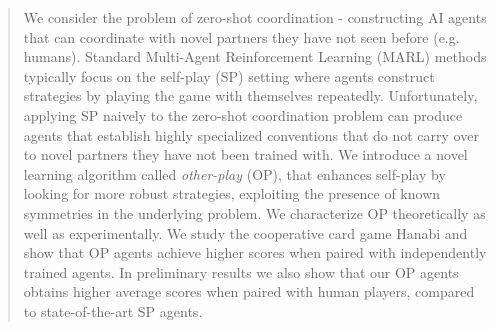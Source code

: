 \begin{abstract}
We consider the problem of zero-shot coordination - constructing AI agents that can coordinate with novel partners they have not seen before (e.g. humans). Standard Multi-Agent Reinforcement Learning (MARL) methods typically focus on the self-play (SP) setting where agents construct strategies by playing the game with themselves repeatedly. Unfortunately, applying SP naively to the zero-shot coordination problem can produce agents that establish highly specialized conventions that do not carry over to novel partners they have not been trained with. We introduce a novel learning algorithm called \emph{other-play} (OP), that enhances self-play by looking for more robust strategies, exploiting the presence of known symmetries in the underlying problem. We characterize OP theoretically as well as experimentally. We study the cooperative card game Hanabi and show that OP agents achieve higher scores when paired with independently trained agents. In preliminary results we also show that our OP agents obtains higher average scores when paired with human players, compared to state-of-the-art SP agents.
\end{abstract}